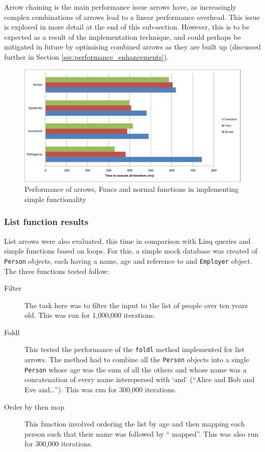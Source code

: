 \documentclass[12pt,twoside,notitlepage]{report}
\begin{document}
Arrow chaining is the main performance issue arrows have, as increasingly complex combinations of arrows lead to a linear performance overhead. This issue is explored in more detail at the end of this sub-section. However, this is to be expected as a result of the implementation technique, and could perhaps be mitigated in future by optimising combined arrows as they are built up (discussed further in Section \ref{sec:performance_enhancements}).

\begin{figure}[!ht]
  \centering
  \includegraphics[width=\textwidth]{fig/SimpleFunctionPerformanceChart.pdf}
  \caption{Performance of arrows, Funcs and normal functions in implementing simple functionality}
  \label{fig:simple_function_performance}
\end{figure}

\subsubsection{List function results}

List arrows were also evaluated, this time in comparison with Linq queries and simple functions based on loops. For this, a simple mock database was created of \texttt{Person} objects, each having a name, age and reference to and \texttt{Employer} object. The three functions tested follow:

\begin{description}
	\item[Filter] The task here was to filter the input to the list of people over ten years old. This was run for 1,000,000 iterations.
	\item[Foldl] This tested the performance of the \texttt{foldl} method implemented for list arrows. The method had to combine all the \texttt{Person} objects into a single \texttt{Person} whose age was the sum of all the others and whose name was a concatenation of every name interspersed with `and' (``Alice and Bob and Eve and\ldots''). This was run for 300,000 iterations.
	\item[Order by then map] This function involved ordering the list by age and then mapping each person such that their name was followed by `` mapped''. This was also run for 300,000 iterations.
\end{description}
\end{document}
